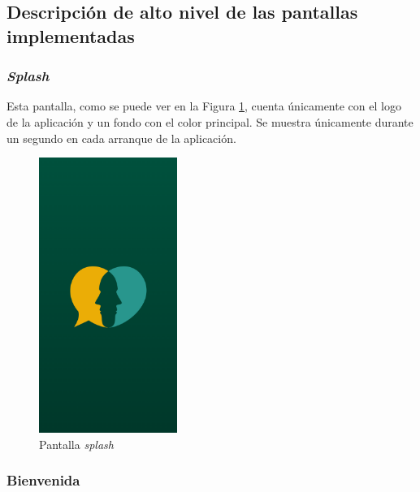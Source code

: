             \clearpage  %

        \subsection{Descripción de alto nivel de las pantallas implementadas}
            \label{section:implementacion:pantallas}

            \subsubsection*{\textit{Splash}}
                Esta pantalla, como se puede ver en la Figura \ref{figure:implementacion:pantalla:splash}, cuenta únicamente con el logo de la aplicación y un fondo con el color principal. Se muestra únicamente durante un segundo en cada arranque de la aplicación. 
                \begin{figure}[h]
                	\centering
                	\includegraphics[width=0.4\textwidth]{figures/pantallas/Splash.png}
                	\caption{Pantalla \textit{splash}}
                	\label{figure:implementacion:pantalla:splash}
                \end{figure}

                \clearpage  %
            \subsubsection*{Bienvenida}

